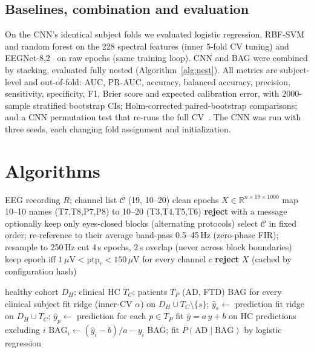\documentclass[journal]{IEEEtran}
\begin{document}
\subsection{Baselines, combination and evaluation}
On the CNN's identical subject folds we evaluated logistic regression, RBF-SVM and random forest on the 228 spectral features (inner 5-fold CV tuning) and EEGNet-8,2~\cite{eegnet} on raw epochs (same training loop). CNN and BAG were combined by stacking, evaluated fully nested (Algorithm~\ref{alg:nest}). All metrics are subject-level and out-of-fold: AUC, PR-AUC, accuracy, balanced accuracy, precision, sensitivity, specificity, F1, Brier score and expected calibration error, with 2000-sample stratified bootstrap CIs; Holm-corrected paired-bootstrap comparisons; and a CNN permutation test that re-runs the full CV~\cite{ojala2010}. The CNN was run with three seeds, each changing fold assignment and initialization.

\section{Algorithms}

\begin{algorithm}[t]
\caption{Harmonized preprocessing}
\label{alg:pre}
\begin{algorithmic}[1]
\Require EEG recording $R$; channel list $\mathcal{C}$ (19, 10--20)
\Ensure clean epochs $X\in\mathbb{R}^{n\times19\times1000}$
\State map 10--10 names (T7,T8,P7,P8) to 10--20 (T3,T4,T5,T6)
 \State \textbf{reject} with a message \EndIf
\State optionally keep only eyes-closed blocks (alternating protocols)
\State select $\mathcal{C}$ in fixed order; re-reference to their average
\State band-pass 0.5--45\,Hz (zero-phase FIR); resample to 250\,Hz
\State cut 4\,s epochs, 2\,s overlap (never across block boundaries)
\State keep epoch iff $1\,\mu\mathrm{V}<\mathrm{ptp}_c<150\,\mu\mathrm{V}$ for every channel $c$
 \State \textbf{reject} \EndIf
\State \Return $X$ (cached by configuration hash)
\end{algorithmic}
\end{algorithm}

\begin{algorithm}[t]
\caption{Brain-age training, transfer and leakage-free BAG}
\label{alg:ba}
\begin{algorithmic}[1]
\Require healthy cohort $D_H$; clinical HC $T_C$; patients $T_P$ (AD, FTD)
\Ensure BAG for every clinical subject
 
  \State fit ridge (inner-CV $\alpha$) on $D_H\cup T_C\setminus\{s\}$; $\hat y_s\gets$ prediction
\EndFor
\State fit ridge on $D_H\cup T_C$; $\hat y_p\gets$ prediction for each $p\in T_P$
  \State fit $\hat y=a\,y+b$ on HC predictions excluding $i$
  \State $\mathrm{BAG}_i\gets(\hat y_i-b)/a-y_i$
\EndFor
\State \Return BAG; fit $P(\mathrm{AD}\mid\mathrm{BAG})$ by logistic regression
\end{algorithmic}
\end{algorithm}
\end{document}

